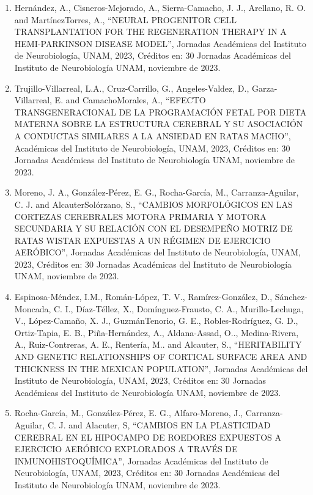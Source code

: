 \documentclass[12pt]{article}
\begin{document}
\begin{enumerate}
\item Hernández, A., Cisneros-Mejorado, A., Sierra-Camacho, J. J., Arellano, R. O. and MartínezTorres, A., “NEURAL PROGENITOR CELL 
TRANSPLANTATION FOR THE REGENERATION THERAPY IN A HEMI-PARKINSON DISEASE MODEL”, Jornadas Académicas del Instituto de Neurobiología, 
UNAM, 2023, Créditos en: 30 Jornadas Académicas del Instituto de Neurobiología UNAM, noviembre de 2023.

\item Trujillo-Villarreal, L.A., Cruz-Carrillo, G., Angeles-Valdez, D., Garza-Villarreal, E. and CamachoMorales, A., “EFECTO 
TRANSGENERACIONAL DE LA PROGRAMACIÓN FETAL POR DIETA MATERNA SOBRE LA ESTRUCTURA CEREBRAL Y SU ASOCIACIÓN A CONDUCTAS SIMILARES A LA 
ANSIEDAD EN RATAS MACHO”, Académicas del Instituto de Neurobiología, UNAM, 2023, Créditos en: 30 Jornadas Académicas del Instituto de 
Neurobiología UNAM, noviembre de 2023.

\item Moreno, J. A., González-Pérez, E. G., Rocha-García, M., Carranza-Aguilar, C. J. and AlcauterSolórzano, S., “CAMBIOS MORFOLÓGICOS 
EN 
LAS CORTEZAS CEREBRALES MOTORA PRIMARIA Y MOTORA SECUNDARIA Y SU RELACIÓN CON EL DESEMPEÑO MOTRIZ DE RATAS WISTAR EXPUESTAS A UN 
RÉGIMEN DE EJERCICIO AERÓBICO”, Jornadas Académicas del Instituto de Neurobiología, UNAM, 2023, Créditos en: 30 Jornadas Académicas del 
Instituto de Neurobiología UNAM, noviembre de 2023.

\item Espinosa-Méndez, I.M., Román-López, T. V., Ramírez-González, D., Sánchez-Moncada, C. I., Díaz-Téllez, X., Domínguez-Frausto, C. 
A., 
Murillo-Lechuga, V., López-Camaño, X. J., GuzmánTenorio, G. E., Robles-Rodríguez, G. D., Ortiz-Tapia, E. B., Piña-Hernández, A., 
Aldana-Assad, O.., Medina-Rivera, A., Ruiz-Contreras, A. E., Rentería, M.. and Alcauter, S., “HERITABILITY AND GENETIC RELATIONSHIPS OF 
CORTICAL SURFACE AREA AND THICKNESS IN THE MEXICAN POPULATION”, Jornadas Académicas del Instituto de Neurobiología, UNAM, 2023, 
Créditos en: 30 Jornadas Académicas del Instituto de Neurobiología UNAM, noviembre de 2023.

\item Rocha-García, M., González-Pérez, E. G., Alfaro-Moreno, J., Carranza-Aguilar, C. J. and Alacuter, S, “CAMBIOS EN LA PLASTICIDAD 
CEREBRAL EN EL HIPOCAMPO DE ROEDORES EXPUESTOS A EJERCICIO AERÓBICO EXPLORADOS A TRAVÉS DE INMUNOHISTOQUÍMICA”, Jornadas Académicas del 
Instituto de Neurobiología, UNAM, 2023, Créditos en: 30 Jornadas Académicas del Instituto de Neurobiología UNAM, noviembre de 2023.


\end{enumerate}
\end{document}
